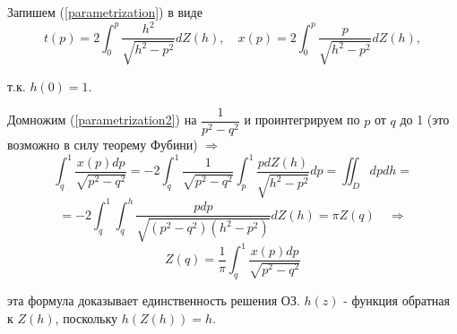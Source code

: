 \documentclass{article}
\begin{document}
Запишем (\ref{parametrization}) в виде
\begin{equation}
	t(p) = 2 \int_0^{p} \dfrac{h^2 }{\sqrt{h^2 - p^2}} dZ(h), \quad
	x(p) = 2 \int_0^{p} \dfrac{p }{\sqrt{h^2 - p^2}} dZ(h),
	\label{parametrization2}
\end{equation}

т.к. $h(0) = 1$.

Домножим (\ref{parametrization2}) на $\dfrac{1}{p^2 - q^2}$ и проинтегрируем по $p$ от $q$ до 1 (это возможно в силу теорему Фубини) $\Rightarrow$ 
\begin{equation*}
	\int_q^1 \dfrac{x(p) dp}{\sqrt{p^2 - q^2}} =
	 -2 \int_q^1 \dfrac{1}{\sqrt{p^2 - q^2}} \int_p^1 \dfrac{p dZ(h)}{\sqrt{h^2 - p^2}} dp =
	  \iint_D dp dh =
\end{equation*}
\begin{equation*}
	  = -2 \int_q^1 \int_q^h \dfrac{p dp}{\sqrt{(p^2 - q^2) (h^2 - p^2)}} dZ(h) = \pi Z(q)
	  \quad \Rightarrow 
\end{equation*}
\begin{equation*}
	Z(q) = \dfrac{1}{\pi} \int_q^1 \dfrac{x(p) dp}{\sqrt{p^2-q^2}}
\end{equation*}

эта формула доказывает единственность решения ОЗ. $h(z)$ - функция обратная к $Z(h)$, поскольку $h(Z(h))=h$.
\end{document}
